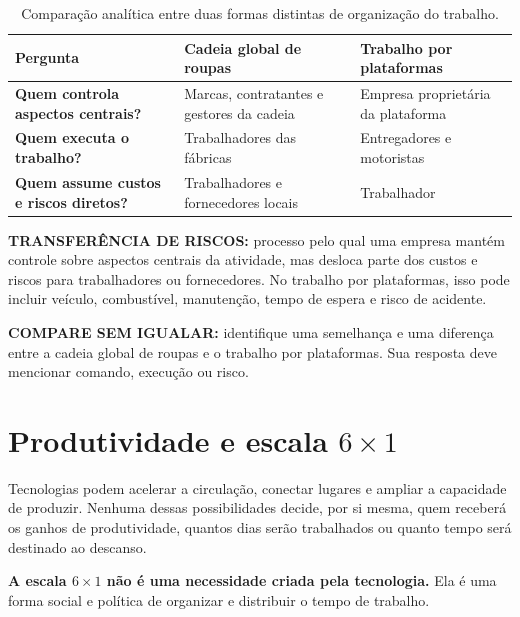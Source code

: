 \begin{table}[htbp]
\centering
\small
\renewcommand{\arraystretch}{1.22}
\begin{tabularx}{\textwidth}{>{\bfseries}Y Y Y}
\toprule
{}
\color{white}Pergunta & \color{white}\bfseries Cadeia global de roupas & \color{white}\bfseries Trabalho por plataformas \\
\midrule
Quem controla aspectos centrais? & Marcas, contratantes e gestores da cadeia & Empresa proprietária da plataforma \\
Quem executa o trabalho? & Trabalhadores das fábricas & Entregadores e motoristas \\
Quem assume custos e riscos diretos? & Trabalhadores e fornecedores locais & Trabalhador \\
\bottomrule
\end{tabularx}
\caption{Comparação analítica entre duas formas distintas de organização do trabalho.}
\end{table}

\begin{conceito}
\textbf{TRANSFERÊNCIA DE RISCOS:} processo pelo qual uma empresa mantém controle sobre aspectos centrais da atividade, mas desloca parte dos custos e riscos para trabalhadores ou fornecedores. No trabalho por plataformas, isso pode incluir veículo, combustível, manutenção, tempo de espera e risco de acidente.
\end{conceito}

\begin{atividade}
\textbf{COMPARE SEM IGUALAR:} identifique uma semelhança e uma diferença entre a cadeia global de roupas e o trabalho por plataformas. Sua resposta deve mencionar comando, execução ou risco.
\end{atividade}

\section{Produtividade e escala \texorpdfstring{$6\times1$}{6x1}}

Tecnologias podem acelerar a circulação, conectar lugares e ampliar a capacidade de produzir. Nenhuma dessas possibilidades decide, por si mesma, quem receberá os ganhos de produtividade, quantos dias serão trabalhados ou quanto tempo será destinado ao descanso.

\begin{frasechave}
\textbf{A escala $6\times1$ não é uma necessidade criada pela tecnologia.} Ela é uma forma social e política de organizar e distribuir o tempo de trabalho.
\end{frasechave}

